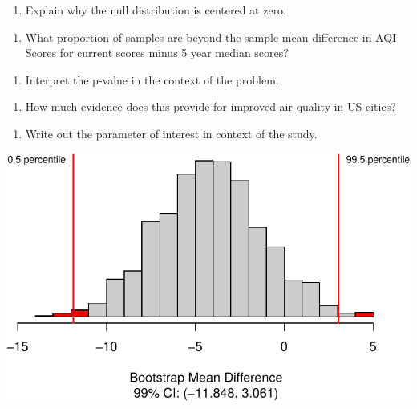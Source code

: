 \documentclass[
]{report}
\providecommand{\tightlist}{%
  \setlength{\itemsep}{0pt}\setlength{\parskip}{0pt}}
\begin{document}
\begin{enumerate}
\def\labelenumi{\arabic{enumi}.}
\setcounter{enumi}{11}
\tightlist
\item
  Explain why the null distribution is centered at zero.
\end{enumerate}

\vspace{1in}

\begin{enumerate}
\def\labelenumi{\arabic{enumi}.}
\setcounter{enumi}{12}
\tightlist
\item
  What proportion of samples are beyond the sample mean difference in AQI Scores for current scores minus 5 year median scores?
\end{enumerate}

\vspace{1in}

\begin{enumerate}
\def\labelenumi{\arabic{enumi}.}
\setcounter{enumi}{13}
\tightlist
\item
  Interpret the p-value in the context of the problem.
\end{enumerate}

\vspace{1in}

\begin{enumerate}
\def\labelenumi{\arabic{enumi}.}
\setcounter{enumi}{14}
\tightlist
\item
  How much evidence does this provide for improved air quality in US cities?
\end{enumerate}

\vspace{1in}

\begin{enumerate}
\def\labelenumi{\arabic{enumi}.}
\setcounter{enumi}{15}
\tightlist
\item
  Write out the parameter of interest in context of the study.
\end{enumerate}

\vspace{1in}

\begin{center}\includegraphics[width=0.7\linewidth]{08-paired_files/figure-latex/unnamed-chunk-5-1} \end{center}
\end{document}
